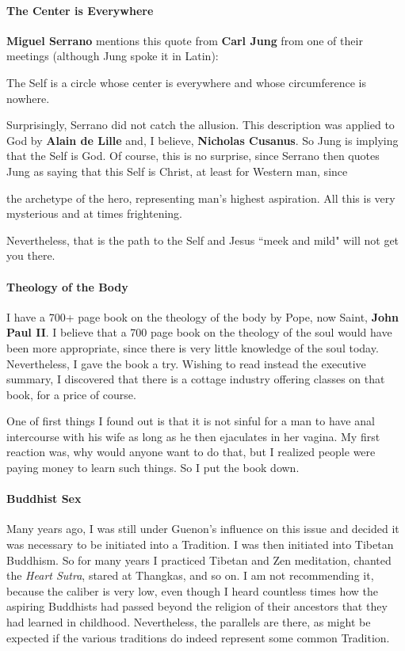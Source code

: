 \paragraph{The Center is Everywhere}
\textbf{Miguel Serrano} mentions this quote from \textbf{Carl Jung} from one of their meetings (although Jung spoke it in Latin):

\begin{quotex}
The Self is a circle whose center is everywhere and whose circumference is nowhere. 

\end{quotex}
Surprisingly, Serrano did not catch the allusion. This description was applied to God by \textbf{Alain de Lille} and, I believe, \textbf{Nicholas Cusanus}. So Jung is implying that the Self is God. Of course, this is no surprise, since Serrano then quotes Jung as saying that this Self is Christ, at least for Western man, since

\begin{quotex}
[Christ is] the archetype of the hero, representing man's highest aspiration. All this is very mysterious and at times frightening. 

\end{quotex}
Nevertheless, that is the path to the Self and Jesus ``meek and mild" will not get you there.

\paragraph{Theology of the Body}
I have a 700+ page book on the theology of the body by Pope, now Saint, \textbf{John Paul II}. I believe that a 700 page book on the theology of the soul would have been more appropriate, since there is very little knowledge of the soul today. Nevertheless, I gave the book a try. Wishing to read instead the executive summary, I discovered that there is a cottage industry offering classes on that book, for a price of course.

One of first things I found out is that it is not sinful for a man to have anal intercourse with his wife as long as he then ejaculates in her vagina. My first reaction was, why would anyone want to do that, but I realized people were paying money to learn such things. So I put the book down.

\paragraph{Buddhist Sex}
Many years ago, I was still under Guenon's influence on this issue and decided it was necessary to be initiated into a Tradition. I was then initiated into Tibetan Buddhism. So for many years I practiced Tibetan and Zen meditation, chanted the \emph{Heart Sutra}, stared at Thangkas, and so on. I am not recommending it, because the caliber is very low, even though I heard countless times how the aspiring Buddhists had passed beyond the religion of their ancestors that they had learned in childhood. Nevertheless, the parallels are there, as might be expected if the various traditions do indeed represent some common Tradition.

